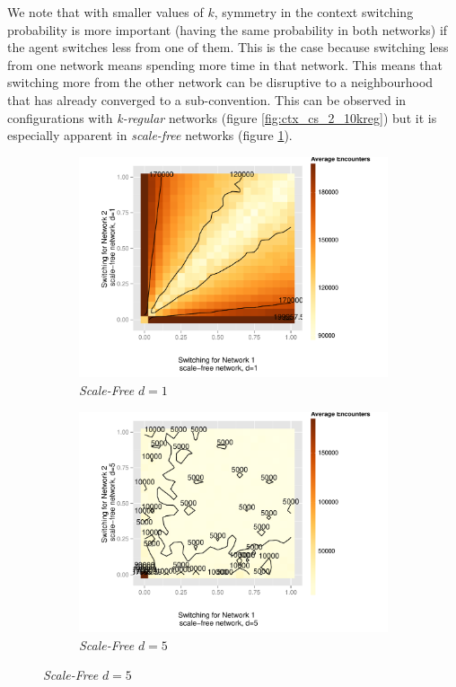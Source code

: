 \documentclass[preprint,number]{elsarticle}
\begin{document}
\noindent We note that with smaller values of $k$, symmetry in the context switching probability is more important (having the same probability in both networks) if the agent switches less from one of them. This is the case because switching less from one network means spending more time in that network. This means that switching more from the other network can be disruptive to a neighbourhood that has already converged to a sub-convention. This can be observed in configurations with \textit{k-regular} networks (figure \ref{fig:ctx_cs_2_10kreg}) but it is especially apparent in \textit{scale-free} networks (figure \ref{fig:ctx_cs_2_sf_d1}).

\begin{figure}[H]
	\centering
	\begin{subfigure}{0.49\linewidth}
		\centering
		\includegraphics[width=1\linewidth]{"../analysis/pdf/context_switching_2_sf_d1_switching_contour"}
		\caption{\textit{Scale-Free} $d=1$}
		\label{fig:ctx_cs_2_sf_d1}
	\end{subfigure}%
	\begin{subfigure}{0.49\linewidth}
		\centering
		\includegraphics[width=1\linewidth]{"../analysis/pdf/context_switching_2_sf_d5_switching_contour"}
		\caption{\textit{Scale-Free} $d=5$}
		\label{fig:ctx_cs_2_sf_d5}
	\end{subfigure}
	

\end{figure}
\end{document}
